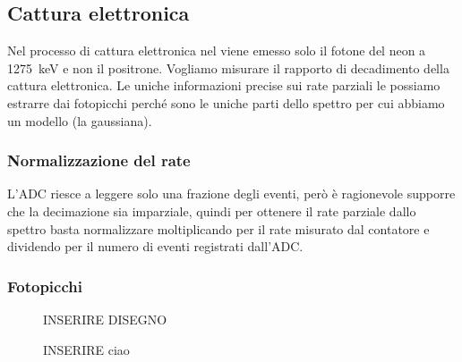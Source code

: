 \subsection{Cattura elettronica}

Nel processo di cattura elettronica nel \na{}
viene emesso solo il fotone del neon a \SI{1275}{keV} e non il positrone.
Vogliamo misurare il rapporto di decadimento della cattura elettronica.
Le uniche informazioni precise sui rate parziali le possiamo estrarre dai fotopicchi
perché sono le uniche parti dello spettro per cui abbiamo un modello (la gaussiana).

\subsubsection{Normalizzazione del rate}

L'ADC riesce a leggere solo una frazione degli eventi,
però è ragionevole supporre che la decimazione sia imparziale,
quindi per ottenere il rate parziale dallo spettro basta normalizzare
moltiplicando per il rate misurato dal contatore
e dividendo per il numero di eventi registrati dall'ADC.

\subsubsection{Fotopicchi}

\begin{figure}
	\centering
	INSERIRE DISEGNO
	\caption{\label{fig:fotopicchi}
	INSERIRE ciao}
\end{figure}


